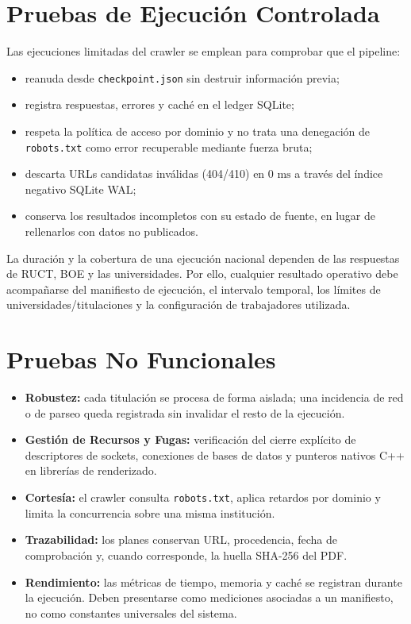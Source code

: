 \section{Pruebas de Ejecución Controlada}
Las ejecuciones limitadas del crawler se emplean para comprobar que el pipeline:
\begin{itemize}
    \item reanuda desde \texttt{checkpoint.json} sin destruir información previa;
    \item registra respuestas, errores y caché en el ledger SQLite;
    \item respeta la política de acceso por dominio y no trata una denegación de \texttt{robots.txt} como error recuperable mediante fuerza bruta;
    \item descarta URLs candidatas inválidas (404/410) en $0\text{ ms}$ a través del índice negativo SQLite WAL;
    \item conserva los resultados incompletos con su estado de fuente, en lugar de rellenarlos con datos no publicados.
\end{itemize}

La duración y la cobertura de una ejecución nacional dependen de las respuestas de RUCT, BOE y las universidades. Por ello, cualquier resultado operativo debe acompañarse del manifiesto de ejecución, el intervalo temporal, los límites de universidades/titulaciones y la configuración de trabajadores utilizada.

\section{Pruebas No Funcionales}
\begin{itemize}
    \item \textbf{Robustez:} cada titulación se procesa de forma aislada; una incidencia de red o de parseo queda registrada sin invalidar el resto de la ejecución.
    \item \textbf{Gestión de Recursos y Fugas:} verificación del cierre explícito de descriptores de sockets, conexiones de bases de datos y punteros nativos C++ en librerías de renderizado.
    \item \textbf{Cortesía:} el crawler consulta \texttt{robots.txt}, aplica retardos por dominio y limita la concurrencia sobre una misma institución.
    \item \textbf{Trazabilidad:} los planes conservan URL, procedencia, fecha de comprobación y, cuando corresponde, la huella SHA-256 del PDF.
    \item \textbf{Rendimiento:} las métricas de tiempo, memoria y caché se registran durante la ejecución. Deben presentarse como mediciones asociadas a un manifiesto, no como constantes universales del sistema.
\end{itemize}

